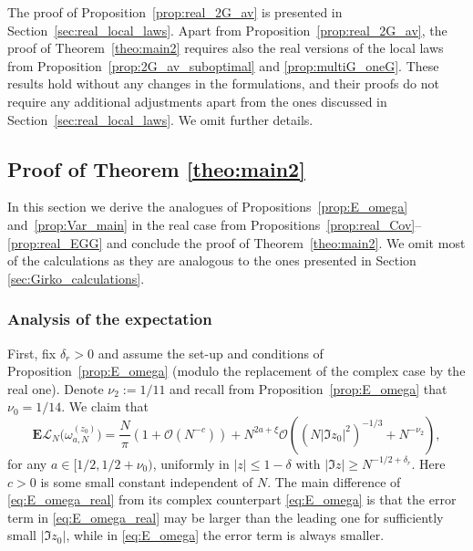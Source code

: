 \documentclass[10pt]{amsart}
\numberwithin{equation}{section}
\newcommand{\E}{\mathbf{E}}
\begin{document}
The proof of Proposition~\ref{prop:real_2G_av} is presented in Section~\ref{sec:real_local_laws}. Apart from Proposition~\ref{prop:real_2G_av}, the proof of Theorem~\ref{theo:main2} requires also the real versions of the local laws from Proposition~\ref{prop:2G_av_suboptimal} and \ref{prop:multiG_oneG}. These results hold without any changes in the formulations, and their proofs do not require any additional adjustments apart from the ones discussed in Section~\ref{sec:real_local_laws}. We omit further details.  

\subsection{Proof of Theorem \ref{theo:main2}}\label{sec:theo2} In this section we derive the analogues of Propositions~\ref{prop:E_omega} and~\ref{prop:Var_main} in the real case from Propositions~\ref{prop:real_Cov}--\ref{prop:real_EGG} and conclude the proof of Theorem~\ref{theo:main2}. We omit most of the calculations as they are analogous to the ones presented in Section \ref{sec:Girko_calculations}.

\subsubsection{Analysis of the expectation} First, fix $\delta_r>0$ and assume the set-up and conditions of Proposition~\ref{prop:E_omega} (modulo the replacement of the complex case by the real one). Denote $\nu_2:=1/11$ and recall from Proposition~\ref{prop:E_omega} that $\nu_0=1/14$. We claim that
\begin{equation}
\E\mathcal{L}_N\big(\omega_{a,N}^{(z_0)}\big) = \frac{N}{\pi}\left(1+\mathcal{O}(N^{-c})\right) + N^{2a+\xi}\mathcal{O}\left(\left(N|\Im z_0|^2\right)^{-1/3} + N^{-\nu_2}\right),
\label{eq:E_omega_real}
\end{equation}
for any $a\in [1/2,1/2+\nu_0)$, uniformly in $|z|\le 1-\delta$ with $|\Im z|\ge N^{-1/2+\delta_r}$. Here $c>0$ is some small constant independent of $N$. The main difference of \eqref{eq:E_omega_real} from its complex counterpart \eqref{eq:E_omega} is that the error term in \eqref{eq:E_omega_real} may be larger than the leading one for sufficiently small $|\Im z_0|$, while in \eqref{eq:E_omega} the error term is always smaller. 
\end{document}
